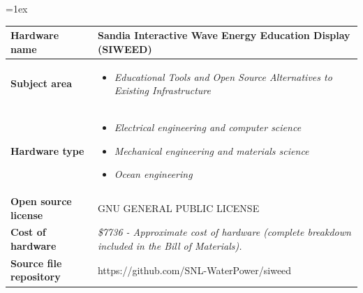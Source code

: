 \documentclass[11pt, letterpaper]{article}
\begin{document}
\begin{flushleft}
\tabulinesep=1ex
\begin{tabu} to \linewidth {|X|X[3,l]|}
\hline  \textbf{Hardware name} & Sandia Interactive Wave Energy Education Display (SIWEED)
  \\
  \hline \textbf{Subject area} & %
  \begin{itemize}
  \item \textit{Educational Tools and Open Source Alternatives to Existing Infrastructure}
  \end{itemize}
  \\
  \hline \textbf{Hardware type} &
  \begin{itemize}
  \item \textit{Electrical engineering and computer science}
  \item \textit{Mechanical engineering and materials science}
  \item \textit{Ocean engineering}
  \end{itemize}
  \\ 
\hline \textbf{Open source license} &
  GNU GENERAL PUBLIC LICENSE
  \\
\hline \textbf{Cost of hardware} &
  \textit{\$7736 - Approximate cost of hardware (complete breakdown included in the Bill of Materials).}
  \\
\hline \textbf{Source file repository} & 
  https://github.com/SNL-WaterPower/siweed
\\\hline
\end{tabu}
 
\end{flushleft}
\end{document}
